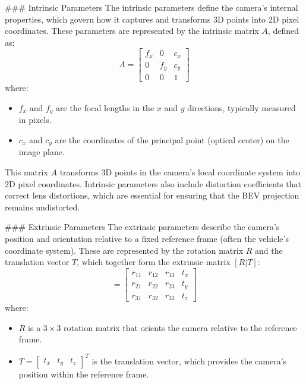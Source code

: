 \begin{itemize}
### Intrinsic Parameters
The intrinsic parameters define the camera’s internal properties, which govern how it captures and transforms 3D points into 2D pixel coordinates. These parameters are represented by the intrinsic matrix \( A \), defined as:
\begin{equation}
    A = \begin{bmatrix}
    f_x & 0 & c_x \\
    0 & f_y & c_y \\
    0 & 0 & 1 
    \end{bmatrix}
\end{equation}
where:
\begin{itemize}
    \item \( f_x \) and \( f_y \) are the focal lengths in the \( x \) and \( y \) directions, typically measured in pixels.
    \item \( c_x \) and \( c_y \) are the coordinates of the principal point (optical center) on the image plane.
\end{itemize}
This matrix \( A \) transforms 3D points in the camera’s local coordinate system into 2D pixel coordinates. Intrinsic parameters also include distortion coefficients that correct lens distortions, which are essential for ensuring that the BEV projection remains undistorted.

### Extrinsic Parameters
The extrinsic parameters describe the camera's position and orientation relative to a fixed reference frame (often the vehicle's coordinate system). These are represented by the rotation matrix \( R \) and the translation vector \( T \), which together form the extrinsic matrix \( [R | T] \):
\begin{equation}
    [R | T] = \begin{bmatrix}
    r_{11} & r_{12} & r_{13} & t_x \\
    r_{21} & r_{22} & r_{23} & t_y \\
    r_{31} & r_{32} & r_{33} & t_z 
    \end{bmatrix}
\end{equation}
where:
\begin{itemize}
    \item \( R \) is a \( 3 \times 3 \) rotation matrix that orients the camera relative to the reference frame.
    \item \( T = \begin{bmatrix} t_x & t_y & t_z \end{bmatrix}^T \) is the translation vector, which provides the camera’s position within the reference frame.
\end{itemize}


\end{itemize}
